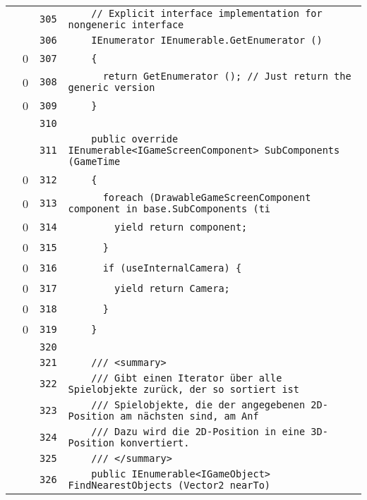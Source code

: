 \documentclass[a4paper,10pt]{article}
\begin{document}
\begin{longtable}[l]{lrrl}
\cellcolor{gray} &  & \verb~305~ & \verb~    // Explicit interface implementation for nongeneric interface~\\
\cellcolor{gray} &  & \verb~306~ & \verb~    IEnumerator IEnumerable.GetEnumerator ()~\\
\cellcolor{red} & 0 & \verb~307~ & \verb~    {~\\
\cellcolor{red} & 0 & \verb~308~ & \verb~      return GetEnumerator (); // Just return the generic version~\\
\cellcolor{red} & 0 & \verb~309~ & \verb~    }~\\
\cellcolor{gray} &  & \verb~310~ & \verb~~\\
\cellcolor{gray} &  & \verb~311~ & \verb~    public override IEnumerable<IGameScreenComponent> SubComponents (GameTime ~\\
\cellcolor{red} & 0 & \verb~312~ & \verb~    {~\\
\cellcolor{red} & 0 & \verb~313~ & \verb~      foreach (DrawableGameScreenComponent component in base.SubComponents (ti~\\
\cellcolor{red} & 0 & \verb~314~ & \verb~        yield return component;~\\
\cellcolor{red} & 0 & \verb~315~ & \verb~      }~\\
\cellcolor{red} & 0 & \verb~316~ & \verb~      if (useInternalCamera) {~\\
\cellcolor{red} & 0 & \verb~317~ & \verb~        yield return Camera;~\\
\cellcolor{red} & 0 & \verb~318~ & \verb~      }~\\
\cellcolor{red} & 0 & \verb~319~ & \verb~    }~\\
\cellcolor{gray} &  & \verb~320~ & \verb~~\\
\cellcolor{gray} &  & \verb~321~ & \verb~    /// <summary>~\\
\cellcolor{gray} &  & \verb~322~ & \verb~    /// Gibt einen Iterator über alle Spielobjekte zurück, der so sortiert ist~\\
\cellcolor{gray} &  & \verb~323~ & \verb~    /// Spielobjekte, die der angegebenen 2D-Position am nächsten sind, am Anf~\\
\cellcolor{gray} &  & \verb~324~ & \verb~    /// Dazu wird die 2D-Position in eine 3D-Position konvertiert.~\\
\cellcolor{gray} &  & \verb~325~ & \verb~    /// </summary>~\\
\cellcolor{gray} &  & \verb~326~ & \verb~    public IEnumerable<IGameObject> FindNearestObjects (Vector2 nearTo)~\\

\end{longtable}
\end{document}

